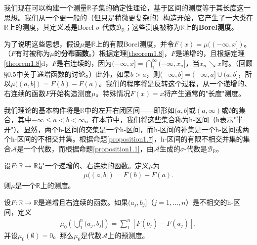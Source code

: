 \documentclass[lang=cn,10pt,thmcnt=section]{elegantbook}
\begin{document}
我们现在可以构建一个测量$\mathbb{R}$子集的确定性理论，基于区间的测度等于其长度这一思想。我们从一个更一般的（但只是稍微更复杂的）构造开始，它产生了一大类在$\mathbb{R}$上的测度，其定义域是Borel $\sigma$-代数$\mathcal{B}_{\mathbb{R}}$；这些测度被称为$\mathbb{R}$上的\textbf{Borel测度}。

为了说明这些思想，假设$\mu$是$\mathbb{R}$上的有限Borel测度，并令$F(x) = \mu((-\infty, x])$。（$F$有时被称为$\mu$的\textbf{分布函数}。）根据定理\ref{theorem1.8}，$F$是递增的，且根据定理\ref{theorem1.8}d，$F$是右连续的，因为$(-\infty, x] = \bigcap_{1}^{\infty}(-\infty, x_n]$，当$x_n \searrow x$时。（回顾§0.5中关于递增函数的讨论。）此外，如果$b > a$，则$(-\infty, b] = (-\infty, a] \cup (a, b]$，所以$\mu((a, b]) = F(b) - F(a)$。我们的程序将是反转这个过程，从一个递增的、右连续的函数$F$开始构造测度$\mu$。特殊情况$F(x) = x$将产生通常的"长度"测度。

我们理论的基本构件将是$\mathbb{R}$中的左开右闭区间——即形如$(a, b]$或$(a, \infty)$或$\emptyset$的集合，其中$-\infty \leq a < b < \infty$。在本节中，我们将这些集合称为h-区间（h表示"半开"）。显然，两个h-区间的交集是一个h-区间，而h-区间的补集是一个h-区间或两个h-区间的不相交并集。根据命题\ref{proposition1.7}，h-区间的有限不相交并集的集合$\mathcal{A}$是一个代数，而根据命题\ref{proposition1.1}，由$\mathcal{A}$生成的$\sigma$-代数是$\mathcal{B}_{\mathbb{R}}$。

\begin{definition}
设$F : \mathbb{R} \to \mathbb{R}$是一个递增的、右连续的函数。定义$\mu$为
\begin{align}
\mu((a, b]) = F(b) - F(a).
\end{align}
则$\mu$是一个$\mathbb{R}$上的测度。
\end{definition}

\begin{proposition}\label{proposition1.15}
	设$F : \mathbb{R} \to \mathbb{R}$是递增且右连续的函数。如果$(a_j, b_j]$（$j = 1, \ldots, n$）是不相交的h-区间，定义
	\begin{align}
	\mu_0\left(\bigcup_{1}^{n}(a_j, b_j]\right) = \sum_{1}^{n}[F(b_j) - F(a_j)],
	\end{align}
	并设$\mu_0(\emptyset) = 0$。那么$\mu_0$是代数$\mathcal{A}$上的预测度。
	\end{proposition}
	
\end{document}
